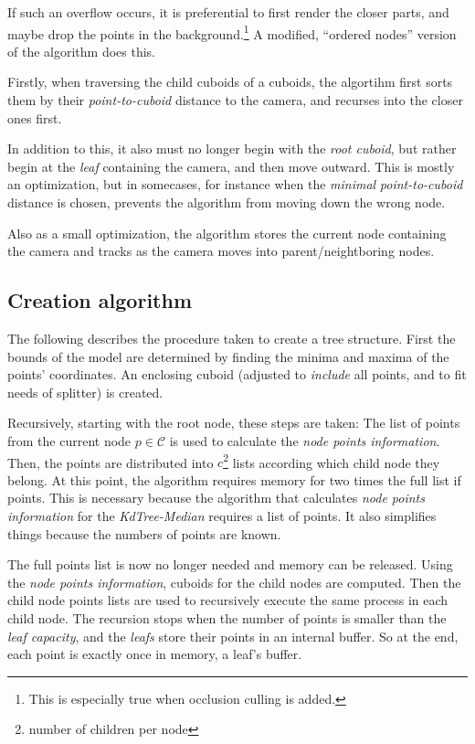 \documentclass[a4paper,10pt,abstracton,notitlepage]{scrreprt}
\begin{document}
If such an overflow occurs, it is preferential to first render the closer parts, and maybe drop the points in the background.\footnote{This is especially true when occlusion culling is added.} A modified, ``ordered nodes'' version of the algorithm does this.

Firstly, when traversing the child cuboids of a cuboids, the algortihm first sorts them by their \emph{point-to-cuboid} distance to the camera, and recurses into the closer ones first.

In addition to this, it also must no longer begin with the \emph{root cuboid}, but rather begin at the \emph{leaf} containing the camera, and then move outward. This is mostly an optimization, but in somecases, for instance when the \emph{minimal} \emph{point-to-cuboid} distance is chosen, prevents the algorithm from moving down the wrong node.

Also as a small optimization, the algorithm stores the current node containing the camera and tracks as the camera moves into parent/neightboring nodes.

\subsection{Creation algorithm}
The following describes the procedure taken to create a tree structure. First the bounds of the model are determined by finding the minima and maxima of the points' coordinates. An enclosing cuboid (adjusted to \emph{include} all points, and to fit needs of splitter) is created.

Recursively, starting with the root node, these steps are taken: The list of points from the current node $p \in \mathcal{C}$ is used to calculate the \emph{node points information}. Then, the points are distributed into $c$\footnote{number of children per node} lists according which child node they belong. At this point, the algorithm requires memory for two times the full list if points. This is necessary because the algorithm that calculates \emph{node points information} for the \emph{KdTree-Median} requires a list of points. It also simplifies things because the numbers of points are known.

The full points list is now no longer needed and memory can be released. Using the \emph{node points information}, cuboids for the child nodes are computed. Then the child node points lists are used to recursively execute the same process in each child node. The recursion stops when the number of points is smaller than the \emph{leaf capacity}, and the \emph{leafs} store their points in an internal buffer. So at the end, each point is exactly once in memory, a leaf's buffer.
\end{document}
